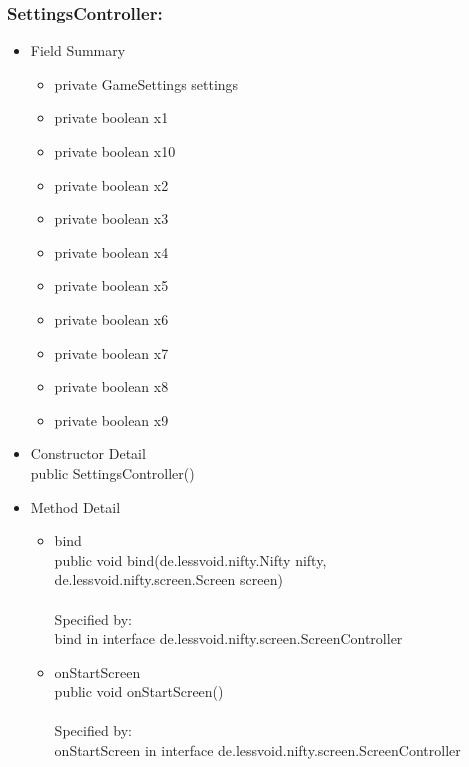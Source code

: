 \documentclass[letterpaper]{article}
\begin{document}
						\subsubsection*{SettingsController:}
						\vspace{0.1in}	
							\begin{itemize}
								\item	Field Summary
										\begin{itemize}
											\item	private GameSettings	settings 
											\item	private boolean	x1 
											\item	private boolean	x10 
											\item	private boolean	x2 
											\item	private boolean	x3 
											\item	private boolean	x4 
											\item	private boolean	x5 
											\item	private boolean	x6 
											\item	private boolean	x7 
											\item	private boolean	x8 
											\item	private boolean	x9 
										\end{itemize}
								\item	Constructor Detail \\
										public SettingsController()
								\item	Method Detail
										\begin{itemize}
											\item	bind \\
													public void bind(de.lessvoid.nifty.Nifty nifty, \\
				        de.lessvoid.nifty.screen.Screen screen) \\ \\
													Specified by: \\
													bind in interface de.lessvoid.nifty.screen.ScreenController
											\item	onStartScreen \\
													public void onStartScreen() \\ \\
													Specified by: \\
													onStartScreen in interface de.lessvoid.nifty.screen.ScreenController

\end{itemize}
\end{itemize}
\end{document}
